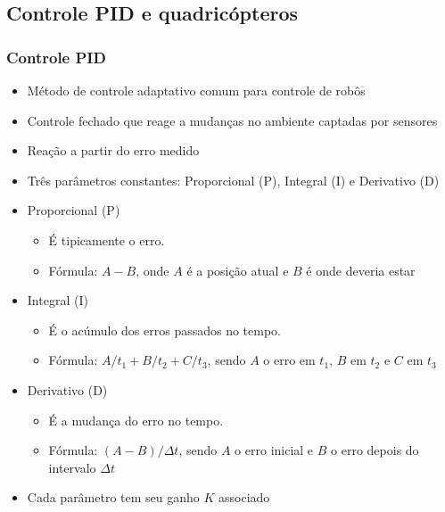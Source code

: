 \documentclass{beamer}
\begin{document}
\subsection*{Controle PID e quadricópteros}
\begin{frame}[allowframebreaks]
	
	\frametitle{Controle PID}
	\begin{itemize}
	
		\item Método de controle adaptativo comum para controle de robôs
		
		\item Controle fechado que reage a mudanças no ambiente captadas por sensores
		
		\item Reação a partir do erro medido
		
		\item Três parâmetros constantes: Proporcional (P), Integral (I) e Derivativo (D)
		
	\framebreak
	
		\item Proporcional (P)
			\begin{itemize}
				\item É tipicamente o erro. 
				\item Fórmula: $A - B$, onde $A$ é a posição atual e $B$ é onde deveria estar 	
			\end{itemize}
			
		\item Integral (I)
		\begin{itemize}
			\item É o acúmulo dos erros passados no tempo. 
			\item Fórmula: $A/t_1 + B/t_2 + C/t_3$, sendo $A$ o erro em $t_1$, $B$ em $t_2$ e $C$ em $t_3$ 	
		\end{itemize}	
		
		\item Derivativo (D)
		\begin{itemize}
			\item É a mudança do erro no tempo. 
			\item Fórmula: $(A-B)/\Delta t$, sendo $A$ o erro inicial e $B$ o erro depois do intervalo $\Delta t$ 	
		\end{itemize}	
		
	\framebreak
	
		\item Cada parâmetro tem seu ganho $K$ associado
		

\end{itemize}
\end{frame}
\end{document}
